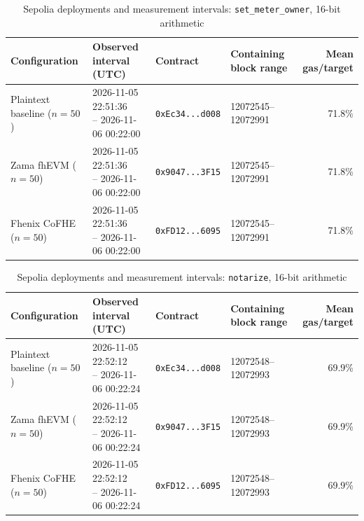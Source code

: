 \begin{table}[!t]
\caption{Sepolia deployments and measurement intervals: \texttt{set\_meter\_owner}, 16-bit arithmetic}
\label{tab:sepolia-experiment-deployments-classic-euint16-set-meter-owner}
\centering
\footnotesize
\setlength{\tabcolsep}{4pt}
\begin{tabular}{|l|l|l|l|r|}
\hline
\textbf{Configuration} &
\textbf{Observed interval (UTC)} &
\textbf{Contract} &
\textbf{Containing block range} &
\textbf{Mean gas/target} \\
\hline
Plaintext baseline (\(n=50\)) &
\shortstack[l]{2026-11-05 22:51:36 \\ -- 2026-11-06 00:22:00} &
\texttt{0xEc34...d008} &
12072545--12072991 &
71.8\% \\
\hline
Zama fhEVM (\(n=50\)) &
\shortstack[l]{2026-11-05 22:51:36 \\ -- 2026-11-06 00:22:00} &
\texttt{0x9047...3F15} &
12072545--12072991 &
71.8\% \\
\hline
Fhenix CoFHE (\(n=50\)) &
\shortstack[l]{2026-11-05 22:51:36 \\ -- 2026-11-06 00:22:00} &
\texttt{0xFD12...6095} &
12072545--12072991 &
71.8\% \\
\hline
\end{tabular}
\end{table}

\begin{table}[!t]
\caption{Sepolia deployments and measurement intervals: \texttt{notarize}, 16-bit arithmetic}
\label{tab:sepolia-experiment-deployments-classic-euint16-notarize}
\centering
\footnotesize
\setlength{\tabcolsep}{4pt}
\begin{tabular}{|l|l|l|l|r|}
\hline
\textbf{Configuration} &
\textbf{Observed interval (UTC)} &
\textbf{Contract} &
\textbf{Containing block range} &
\textbf{Mean gas/target} \\
\hline
Plaintext baseline (\(n=50\)) &
\shortstack[l]{2026-11-05 22:52:12 \\ -- 2026-11-06 00:22:24} &
\texttt{0xEc34...d008} &
12072548--12072993 &
69.9\% \\
\hline
Zama fhEVM (\(n=50\)) &
\shortstack[l]{2026-11-05 22:52:12 \\ -- 2026-11-06 00:22:24} &
\texttt{0x9047...3F15} &
12072548--12072993 &
69.9\% \\
\hline
Fhenix CoFHE (\(n=50\)) &
\shortstack[l]{2026-11-05 22:52:12 \\ -- 2026-11-06 00:22:24} &
\texttt{0xFD12...6095} &
12072548--12072993 &
69.9\% \\
\hline
\end{tabular}
\end{table}

